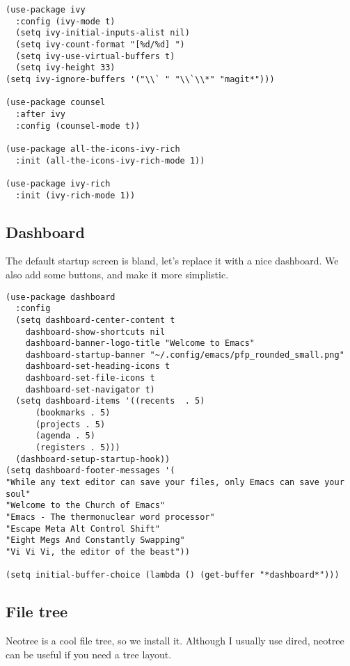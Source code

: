 \documentclass[11pt]{article}
\begin{document}
\begin{verbatim}
(use-package ivy
  :config (ivy-mode t)
  (setq ivy-initial-inputs-alist nil)
  (setq ivy-count-format "[%d/%d] ")
  (setq ivy-use-virtual-buffers t)
  (setq ivy-height 33)
(setq ivy-ignore-buffers '("\\` " "\\`\\*" "magit*")))

(use-package counsel
  :after ivy
  :config (counsel-mode t))

(use-package all-the-icons-ivy-rich
  :init (all-the-icons-ivy-rich-mode 1))

(use-package ivy-rich
  :init (ivy-rich-mode 1))
\end{verbatim}

\subsection*{Dashboard}
\label{sec:org762ab52}

The default startup screen is bland, let's replace it with a nice dashboard. We also add some buttons, and make it more simplistic.

\begin{verbatim}
(use-package dashboard
  :config
  (setq dashboard-center-content t
    dashboard-show-shortcuts nil
    dashboard-banner-logo-title "Welcome to Emacs"
    dashboard-startup-banner "~/.config/emacs/pfp_rounded_small.png"
    dashboard-set-heading-icons t
    dashboard-set-file-icons t
    dashboard-set-navigator t)
  (setq dashboard-items '((recents  . 5)
      (bookmarks . 5)
      (projects . 5)
      (agenda . 5)
      (registers . 5)))
  (dashboard-setup-startup-hook))
(setq dashboard-footer-messages '(
"While any text editor can save your files, only Emacs can save your soul"
"Welcome to the Church of Emacs"
"Emacs - The thermonuclear word processor"
"Escape Meta Alt Control Shift"
"Eight Megs And Constantly Swapping"
"Vi Vi Vi, the editor of the beast"))

(setq initial-buffer-choice (lambda () (get-buffer "*dashboard*")))
\end{verbatim}

\subsection*{File tree}
\label{sec:org7570509}

Neotree is a cool file tree, so we install it. Although I usually use dired, neotree can be useful if you need a tree layout.
\end{document}

